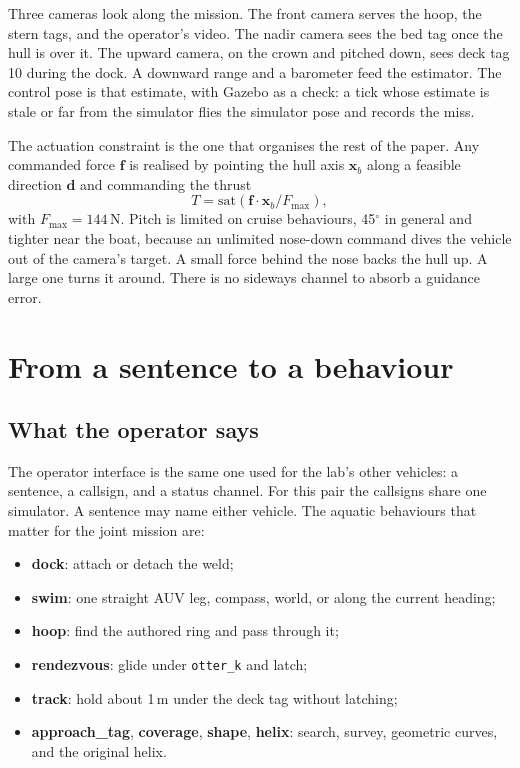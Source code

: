 \documentclass[conference]{IEEEtran}
\def\otterk{\texttt{otter\_k}}
\begin{document}
Three cameras look along the mission. The front camera serves the hoop, the stern tags, and the operator's video. The nadir camera sees the bed tag once the hull is over it. The upward camera, on the crown and pitched down, sees deck tag 10 during the dock. A downward range and a barometer feed the estimator. The control pose is that estimate, with Gazebo as a check: a tick whose estimate is stale or far from the simulator flies the simulator pose and records the miss.

The actuation constraint is the one that organises the rest of the paper. Any commanded force $\mathbf{f}$ is realised by pointing the hull axis $\mathbf{x}_{b}$ along a feasible direction $\mathbf{d}$ and commanding the thrust
\begin{equation}
T = \mathrm{sat}\!\left(\mathbf{f}\cdot\mathbf{x}_{b} / F_{\max}\right),
\label{eq:thrust}
\end{equation}
with $F_{\max}=144\,\mathrm{N}$. Pitch is limited on cruise behaviours, 45$^\circ$ in general and tighter near the boat, because an unlimited nose-down command dives the vehicle out of the camera's target. A small force behind the nose backs the hull up. A large one turns it around. There is no sideways channel to absorb a guidance error.

\section{From a sentence to a behaviour}
\label{sec:coral}

\subsection{What the operator says}
The operator interface is the same one used for the lab's other vehicles: a sentence, a callsign, and a status channel. For this pair the callsigns share one simulator. A sentence may name either vehicle. The aquatic behaviours that matter for the joint mission are:

\begin{itemize}
\item \textbf{dock}: attach or detach the weld;
\item \textbf{swim}: one straight AUV leg, compass, world, or along the current heading;
\item \textbf{hoop}: find the authored ring and pass through it;
\item \textbf{rendezvous}: glide under \otterk{} and latch;
\item \textbf{track}: hold about 1\,m under the deck tag without latching;
\item \textbf{approach\_tag}, \textbf{coverage}, \textbf{shape}, \textbf{helix}: search, survey, geometric curves, and the original helix.
\end{itemize}
\end{document}
